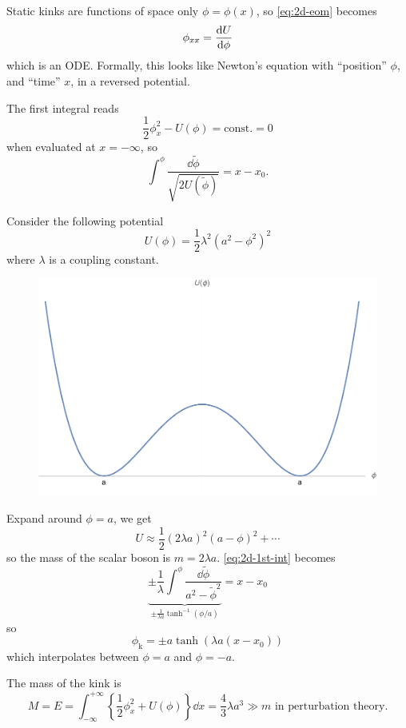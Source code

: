 \documentclass[a4paper,11pt]{article}
\begin{document}
    Static kinks are functions of space only $\phi = \phi(x)$, so \eqref{eq:2d-eom} becomes 
    \begin{equation}
        \phi_{xx} = \dv{U}{\phi}
    \end{equation}
    which is an ODE. Formally, this looks like Newton's equation with ``position'' $\phi$, and ``time'' $x$, in a reversed potential.

    The first integral reads 
    \begin{equation}
        \frac{1}{2} \phi_x^2 - U(\phi) = \text{const.} = 0 
    \end{equation}
    when evaluated at $x = -\infty$, so 
    \begin{equation}
        \int^\phi \frac{\dd{\tilde \phi}}{\sqrt{2 U(\tilde \phi)}} = x - x_0. \label{eq:2d-1st-int}
    \end{equation}

    \begin{ex}
        Consider the following potential 
        \begin{equation}
            U(\phi) = \frac{1}{2} \lambda^2 \left( a^2 - \phi^2 \right)^2
        \end{equation}
        where $\lambda$ is a coupling constant.
        \begin{figure}[H]
            \centering
            \includegraphics[width=0.5\linewidth]{fig/fig0.1.pdf}
        \end{figure}
        Expand around $\phi = a$, we get 
        \begin{equation}
            U \approx \frac{1}{2} (2 \lambda a)^2 (a - \phi)^2 + \cdots 
        \end{equation}
        so the mass of the scalar boson is $m = 2 \lambda a$. \eqref{eq:2d-1st-int} becomes 
        \begin{equation}
            \underbrace{\pm \frac{1}{\lambda} \int^\phi \frac{\dd{\tilde \phi}}{a^2 - {\tilde \phi}^2}}_{\pm \frac{1}{\lambda a} \tanh^{-1}(\phi / a)} = x - x_0
        \end{equation}
        so 
        \begin{equation}
            \phi_\text{k} = \pm a \tanh(\lambda a (x-x_0))
        \end{equation}
        which interpolates between $\phi = a$ and $\phi = -a$. 

        The mass of the kink is 
        \begin{equation}
            M = E = \int_{-\infty}^{+\infty} \left\{ \frac{1}{2} \phi_x^2 + U(\phi) \right\} \dd{x} = \frac{4}{3} \lambda a^3 \gg m \text{ in perturbation theory}.
        \end{equation}
    \end{ex}
\end{document}
